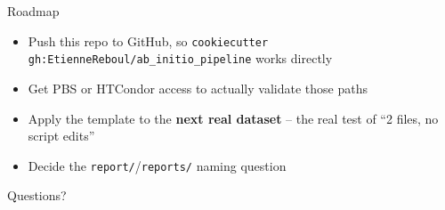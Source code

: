 \documentclass[aspectratio=169]{beamer}
\begin{document}
\begin{frame}{Roadmap}
  \begin{itemize}
    \item Push this repo to GitHub, so
      \texttt{cookiecutter gh:EtienneReboul/ab\_initio\_pipeline} works
      directly
    \item Get PBS or HTCondor access to actually validate those paths
    \item Apply the template to the \textbf{next real dataset} -- the real
      test of ``2 files, no script edits''
    \item Decide the \texttt{report/}/\texttt{reports/} naming question
  \end{itemize}
\end{frame}

\begin{frame}
  \centering
  \Huge Questions?
\end{frame}
\end{document}
